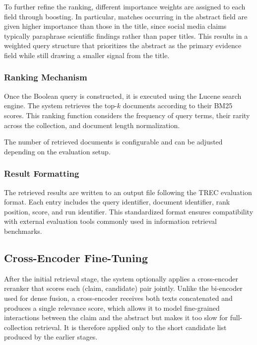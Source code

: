 To further refine the ranking, different importance weights are assigned to each field through boosting. In particular, matches occurring in the abstract field are given higher importance than those in the title, since social media claims typically paraphrase scientific findings rather than paper titles. This results in a weighted query structure that prioritizes the abstract as the primary evidence field while still drawing a smaller signal from the title.

\subsubsection{Ranking Mechanism}

Once the Boolean query is constructed, it is executed using the Lucene search engine. The system retrieves the top-$k$ documents according to their BM25 scores. This ranking function considers the frequency of query terms, their rarity across the collection, and document length normalization.

The number of retrieved documents is configurable and can be adjusted depending on the evaluation setup.

\subsubsection{Result Formatting}

The retrieved results are written to an output file following the TREC evaluation format. Each entry includes the query identifier, document identifier, rank position, score, and run identifier. This standardized format ensures compatibility with external evaluation tools commonly used in information retrieval benchmarks.

\subsection{Cross-Encoder Fine-Tuning}

After the initial retrieval stage, the system optionally applies a cross-encoder reranker that scores each (claim, candidate) pair jointly. Unlike the bi-encoder used for dense fusion, a cross-encoder receives both texts concatenated and produces a single relevance score, which allows it to model fine-grained interactions between the claim and the abstract but makes it too slow for full-collection retrieval. It is therefore applied only to the short candidate list produced by the earlier stages.


